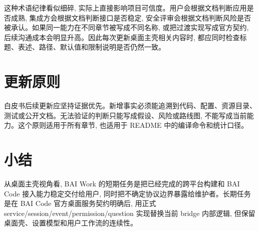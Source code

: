 这种术语纪律看似细碎, 实际上直接影响项目可信度。用户会根据文档判断应用是否成熟, 集成方会根据文档判断接口是否稳定, 安全评审会根据文档判断风险是否被承认。如果同一能力在不同章节被写成不同名称, 或把过渡实现写成官方契约, 后续沟通成本会明显升高。因此每次更新桌面主壳相关内容时, 都应同时检查标题、表述、路径、默认值和限制说明是否仍然一致。

\section{更新原则}
白皮书后续更新应坚持证据优先。新增事实必须能追溯到代码、配置、资源目录、测试或公开文档。无法验证的判断只能写成假设、风险或路线图, 不能写成当前能力。这个原则适用于所有章节, 也适用于 README 中的编译命令和统计口径。

\section{小结}
从桌面主壳视角看, BAI Work 的短期任务是把已经完成的跨平台构建和 BAI Code 接入能力稳定交付给用户, 同时把不确定协议边界暴露给维护者。长期任务是在 BAI Code 官方桌面服务契约明确后, 用正式 service/session/event/permission/question 实现替换当前 bridge 内部逻辑, 但保留桌面壳、设置模型和用户工作流的连续性。

